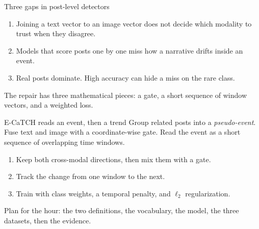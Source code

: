 \begin{frame}{Three gaps in post-level detectors}
  \begin{enumerate}
    \item Joining a text vector to an image vector does not decide which modality to trust when they disagree.
    \item Models that score posts one by one miss how a narrative drifts inside an event.
    \item Real posts dominate. High accuracy can hide a miss on the rare class.
  \end{enumerate}
  \vspace{0.7em}
  The repair has three mathematical pieces: a gate, a short sequence of window vectors, and a weighted loss.
\end{frame}

\begin{frame}{E-CaTCH reads an event, then a trend}
  Group related posts into a \emph{pseudo-event}.
  Fuse text and image with a coordinate-wise gate.
  Read the event as a short sequence of overlapping time windows.
  \vspace{0.7em}
  \begin{enumerate}
    \item Keep both cross-modal directions, then mix them with a gate.
    \item Track the change from one window to the next.
    \item Train with class weights, a temporal penalty, and $\ell_2$ regularization.
  \end{enumerate}
  \vspace{0.55em}
  {\small\color{muted}
    Plan for the hour: the two definitions, the vocabulary, the model, the three datasets, then the evidence.}
\end{frame}

